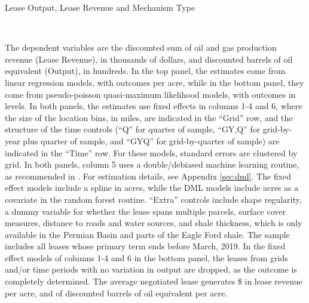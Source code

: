 \documentclass[12pt]{article}
\newcommand{\inputy}[1]{\unskip}
\begin{document}
\addtolength{\tabcolsep}{6pt}
\begin{table}[htbp]
	\caption{Lease Output, Lease Revenue and Mechanism Type \label{tab:output_stacked}}
	\begin{threeparttable}
	\small
	 \\
		\begin{tablenotes}
		\footnotesize
		\item The dependent variables are the discounted sum of oil and gas production revenue (Lease Revenue), in thousands of dollars, and discounted barrels of oil equivalent (Output), in hundreds.  In the top panel, the estimates come from linear regression models, with outcomes per acre, while in the bottom panel, they come from pseudo-poisson quasi-maximum likelihood models, with outcomes in levels.  In both panels, the estimates use fixed effects in columns 1-4 and 6, where the size of the location bins, in miles, are indicated in the ``Grid'' row, and the structure of the time controls (``Q'' for quarter of sample, ``GY,Q'' for grid-by-year plus quarter of sample, and ``GYQ'' for grid-by-quarter of sample) are indicated in the ``Time'' row.  For these models, standard errors are clustered by grid.  In both panels, column 5 uses a double/debiased machine learning routine, as recommended in  \cite{chernozhukov2018double}.  For estimation details, see Appendix \ref{sec:dml}.  The fixed effect models include a spline in acres, while the DML models include acres as a covariate in the random forest routine. ``Extra'' controls include shape regularity, a dummy variable for whether the lease spans multiple parcels, surface cover measures, distance to roads and water sources, and shale thickness, which is only available in the Permian Basin and parts of the Eagle Ford shale.  The sample includes all leases whose primary term ends before March, 2019.  In the fixed effect models of columns 1-4 and 6 in the bottom panel, the leases from grids and/or time periods with no variation in output are dropped, as the outcome is completely determined.  The average negotiated lease generates \$\inputy{../output/estimates/negotiation_avg_revenue.tex} in lease revenue per acre, and \inputy{../output/estimates/negotiation_avg_dboe.tex} of discounted barrels of oil equivalent per acre.    
		\end{tablenotes}	   
	\end{threeparttable}
\end{table}
\addtolength{\tabcolsep}{-6pt}
\end{document}
